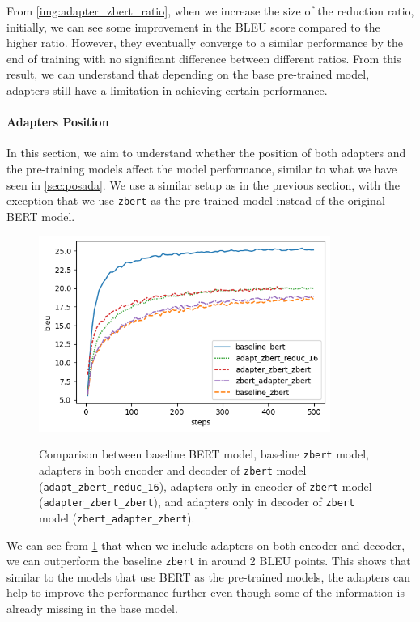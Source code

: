 From \cref{img:adapter_zbert_ratio}, when we increase the size of the reduction ratio, initially, we can see some improvement in the BLEU score compared to the higher ratio. However, they eventually converge to a similar performance by the end of training with no significant difference between different ratios. From this result, we can understand that depending on the base pre-trained model, adapters still have a limitation in achieving certain performance.

\paragraph{Adapters Position}
In this section, we aim to understand whether the position of both adapters and the pre-training models affect the model performance, similar to what we have seen in \cref{sec:posada}. We use a similar setup as in the previous section, with the exception that we use \texttt{zbert} as the pre-trained model instead of the original BERT model.

\begin{figure}[h]
    {\includegraphics[width=0.85\textwidth]{img/zbert_pos.png}}
    \centering
    \caption[Comparison between baseline BERT and \texttt{zbert} models.]{Comparison between baseline BERT model, baseline \texttt{zbert} model, adapters in both encoder and decoder of \texttt{zbert} model (\texttt{adapt\_zbert\_reduc\_16}), adapters only in encoder of \texttt{zbert} model (\texttt{adapter\_zbert\_zbert}), and adapters only in decoder of \texttt{zbert} model (\texttt{zbert\_adapter\_zbert}).}
    \label{img:zbert_pos}
\end{figure}

We can see from \cref{img:zbert_pos} that when we include adapters on both encoder and decoder, we can outperform the baseline \texttt{zbert} in around 2 BLEU points. This shows that similar to the models that use BERT as the pre-trained models, the adapters can help to improve the performance further even though some of the information is already missing in the base model.

